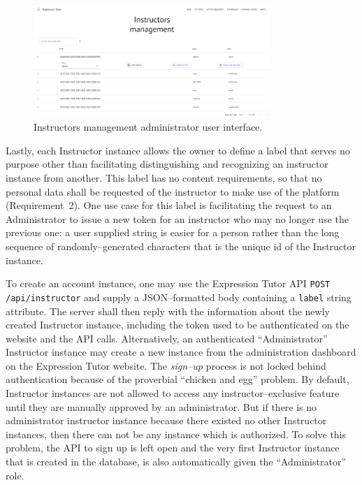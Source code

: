 \begin{chapterBody}
\begin{figure}
    \centering
    \includegraphics[width=0.8\textwidth]{res/6/instructor_admin.png}
    \caption{Instructors management administrator user interface.}
    \label{fig:impl-instructor-admin}
\end{figure}

Lastly, each Instructor instance allows the owner to define a label that
serves no purpose other than facilitating distinguishing and recognizing
an instructor instance from another. This label has no content requirements,
so that no personal data shall be requested of the instructor to make use of
the platform (Requirement~2). One use case for this label is facilitating
the request to an Administrator to issue a new token for an instructor who
may no longer use the previous one: a user supplied string is easier for
a person rather than the long sequence of randomly–generated characters 
that is the unique id of the Instructor instance.

To create an account instance, one may use the Expression Tutor API
\texttt{POST /api/instructor} and supply a JSON–formatted body
containing a \texttt{label} string attribute. The server shall then reply
with the information about the newly created Instructor instance, including
the token used to be authenticated on the website and the API calls.
Alternatively, an authenticated ``Administrator'' Instructor instance may
create a new instance from the administration dashboard on the Expression
Tutor website.
The \textit{sign–up} process is not locked behind authentication because of the
proverbial ``chicken and egg'' problem. By default, Instructor instances are not
allowed to access any instructor–exclusive feature until they are manually
approved by an administrator. But if there is no administrator instructor 
instance because there existed no other Instructor instances, then there can
not be any instance which is authorized. To solve this problem, the API to sign
up is left open and the very first Instructor instance that is created in
the database, is also automatically given the ``Administrator'' role.


\end{chapterBody}
